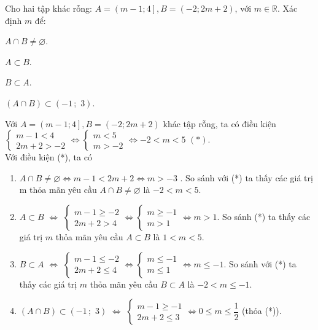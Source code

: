 \begin{bt}%
	Cho hai tập khác rỗng: $A=\left(m-1;4\right],B=\left(-2;2m+2\right)$, với $m\in \mathbb{R}$. Xác định $m$ để:
	\begin{listEX}[2]
		\item $A\cap B\ne\varnothing $.
		\item $A\subset B$.
		\item $B\subset A$.
		\item  $(A\cap B)\subset (-1\,;\,\,3)$.
	\end{listEX}
	\loigiai
	{
		Với $A=\left(m-1;4\right],B=\left(-2;2m+2\right)$ khác tập rỗng, ta có điều kiện\\
		$\left\{\begin{array}{l}
			m-1 < 4\\
			2m+2 >-2
		\end{array}\right.\Leftrightarrow\left\{\begin{array}{l}
			m < 5\\
			m >-2
		\end{array}\right.\Leftrightarrow-2 < m < 5\,\,(*).$\\
		Với điều kiện (*), ta có 		
		\begin{enumerate}
			\item $A\cap B\ne\varnothing\Leftrightarrow m-1 < 2m+2\Leftrightarrow m >-3$ . So sánh với (*) ta thấy các giá trị m thỏa mãn yêu cầu $A\cap B\ne\varnothing $ là $-2 < m < 5$.
			\item $A\subset B$ $\Leftrightarrow $ $\left\{\begin{array}{l}
				m-1\ge-2\\
				2m+2 > 4
			\end{array}\right.\Leftrightarrow\left\{\begin{array}{l}
				m\ge-1\\
				m > 1
			\end{array}\right.\Leftrightarrow m > 1$. So sánh (*) ta thấy các giá trị $m$ thỏa mãn yêu cầu $A\subset B$ là $1 < m < 5$.
			\item $B\subset A$ $\Leftrightarrow $ $\left\{\begin{array}{l}
				m-1\le-2\\
				2m+2\le 4
			\end{array}\right.\Leftrightarrow\left\{\begin{array}{l}
				m\le-1\\
				m\le 1
			\end{array}\right.\Leftrightarrow m\le-1.$ So sánh với (*) ta thấy các giá trị $m$ thỏa mãn yêu cầu $B\subset A$ là $-2 < m\le-1$.
			\item $(A\cap B)\subset (-1\,;\,\,3)$ $\Leftrightarrow $ $\left\{\begin{array}{l}
				m-1\ge-1\\
				2m+2\le 3
			\end{array}\right.\Leftrightarrow 0\le m\le\dfrac{1}{2}$ (thỏa (*)).
		\end{enumerate}
	}
\end{bt}


